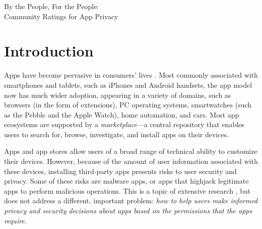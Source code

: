 \documentclass[11pt]{article}
\begin{document}
\setcounter{page}{1}
\pagestyle{empty}
\hypersetup{pageanchor=false}

\begin{center}
{\Large By the People, For the People:\\
  Community Ratings for App Privacy}
\end{center}

\smallskip

\centerline{\bf }

\bigskip

\pagestyle{plain}

\begin{abstract}


\end{abstract}



\doublespacing


\section{Introduction}

Apps have become pervasive
in consumers' lives 
\cite{gplay-50-billion, apple-50-billion}.
Most commonly associated with smartphones and tablets, 
such as iPhones and Android handsets, the app model now has much 
wider adoption, appearing in a variety of domains,
such as browsers (in the form of extensions), PC operating 
systems, smartwatches (such as the Pebble and the Apple Watch), 
home automation,
and cars.
Most app ecosystems are supported by a
\emph{marketplace}---a central repository that
enables users to search for, browse,
investigate, and install apps on their devices. 

Apps and app stores allow users of a broad range
of technical ability to customize their devices.
However,  
because of the amount of user information associated with these 
devices, installing third-party apps presents 
risks to user security and privacy. Some of these risks are malware apps, or 
apps that highjack legitimate apps
to perform malicious operations. This is a topic
of extensive research 
\cite{droidrisk-2013, android-repackaged-CODASPY12, comDroid-MOBISYS11}, 
but does not address a different,
important problem: \emph{how to help users make informed privacy and
  security decisions about apps based on the permissions that the apps
  require}.
\end{document}
